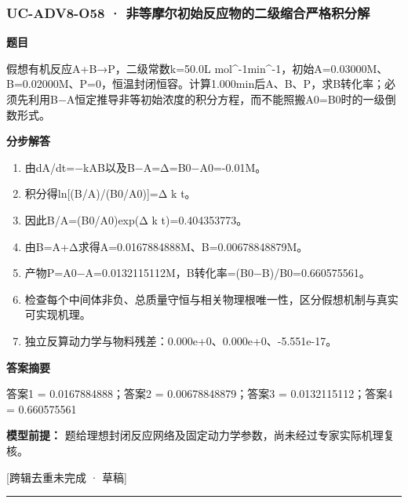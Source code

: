 \documentclass[UTF8,11pt,a4paper]{ctexart}
\begin{document}
\subsubsection*{UC-ADV8-O58 · 非等摩尔初始反应物的二级缩合严格积分解}
\noindent\textbf{题目}\par
假想有机反应A+B→P，二级常数k=50.0L mol\textasciicircum{}-1min\textasciicircum{}-1，初始A=0.03000M、B=0.02000M、P=0，恒温封闭恒容。计算1.000min后A、B、P，求B转化率；必须先利用B−A恒定推导非等初始浓度的积分方程，而不能照搬A0=B0时的一级倒数形式。\par
\medskip\noindent\textbf{分步解答}
\begin{enumerate}
\item 由dA/dt=−kAB以及B−A=Δ=B0−A0=-0.01M。
\item 积分得ln[(B/A)/(B0/A0)]=Δ k t。
\item 因此B/A=(B0/A0)exp(Δ k t)=0.404353773。
\item 由B=A+Δ求得A=0.0167884888M、B=0.00678848879M。
\item 产物P=A0−A=0.0132115112M，B转化率=(B0−B)/B0=0.660575561。
\item 检查每个中间体非负、总质量守恒与相关物理根唯一性，区分假想机制与真实可实现机理。
\item 独立反算动力学与物料残差：0.000e+0、0.000e+0、-5.551e-17。
\end{enumerate}
\noindent\textbf{答案摘要}\par
答案1 = 0.0167884888；答案2 = 0.00678848879；答案3 = 0.0132115112；答案4 = 0.660575561\par
\noindent\textbf{模型前提：}
题给理想封闭反应网络及固定动力学参数，尚未经过专家实际机理复核。\par
\noindent\textcolor{red!65!black}{[跨辑去重未完成 · 草稿]} \par
\medskip\hrule\medskip
{}
\end{document}
